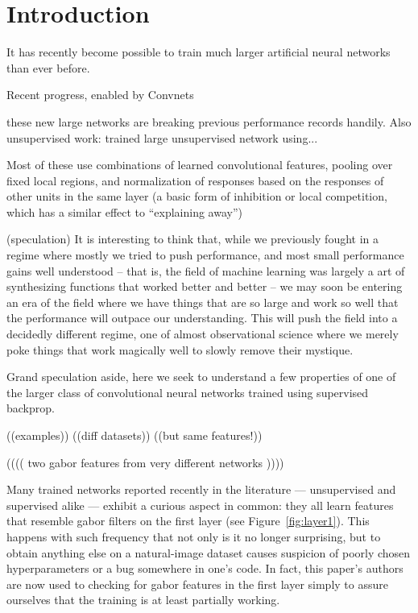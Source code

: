 
\section{Introduction}

It has recently become possible to train much larger artificial neural networks than ever before. 


Recent progress, enabled by Convnets \cite{LeCun89}

these new large networks are breaking previous performance records handily. Also unsupervised work: \cite{Le-2011-ICA} trained large unsupervised network using...

Most of these use combinations of learned convolutional features, pooling over fixed local regions, and normalization of responses based on the responses of other units in the same layer (a basic form of inhibition or local competition, which has a similar effect to ``explaining away'')

(speculation) It is interesting to think that, while we previously fought in a regime where mostly we tried to push performance, and most small performance gains well understood -- that is, the field of machine learning was largely a art of synthesizing functions that worked better and better -- we may soon be entering an era of the field where we have things that are so large and work so well that the performance will outpace our understanding. This will push the  field into a decidedly different regime, one of almost observational science where we merely poke things that work magically well to slowly remove their mystique.

Grand speculation aside, here we seek to understand a few properties of one of the larger class of convolutional neural networks trained using supervised backprop.

((examples))
((diff datasets))
((but same features!))

(((( two gabor features from very different networks ))))


Many trained networks reported recently in the literature --- unsupervised and supervised alike --- exhibit a curious aspect in common: they all learn features that resemble gabor filters on the first layer (see Figure~\ref{fig:layer1}). This happens with such frequency that not only is it no longer surprising, but to obtain anything else on a natural-image dataset causes suspicion of poorly chosen hyperparameters or a bug somewhere in one's code. In fact, this paper's authors are now used to checking for gabor features in the first layer simply to assure ourselves that the training is at least partially working.

